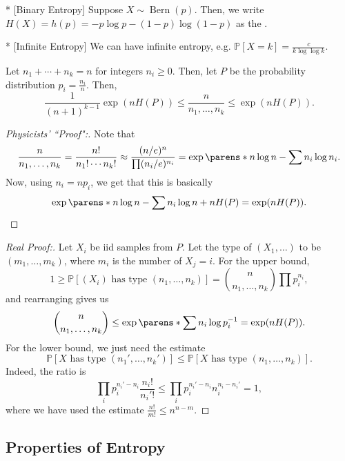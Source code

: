 \begin{exm}*
	[Binary Entropy]
	Suppose $X \sim \operatorname{Bern}(p)$. Then, we write $H(X) = h(p) = -p\log p - (1-p)\log (1-p)$ as the .
\end{exm}

\begin{exm}*
	[Infinite Entropy]
	We can have infinite entropy, e.g. $\mathbb P[X=k] = \frac{c}{k\log \log k}$.
\end{exm}

\begin{fact}
	Let $n_1 + \cdots + n_k = n$ for integers $n_i \geq 0$. Then, let $P$ be the probability distribution $p_i = \frac{n_i}{n}$. Then, \[
		\frac{1}{(n+1)^{k-1}} \exp (nH(P)) \leq \frac{n}{n_1, \ldots, n_k} \leq \exp (nH(P)).
	\]
\end{fact}

\begin{proof}
	[Physicists' ``Proof":]
	Note that \[
		\frac{n}{n_1,\ldots, n_k} = \frac{n!}{n_1!\cdots n_k!} \approx \frac{(n/e)^n}{\prod (n_i/e)^{n_i}} = \exp \parens*{n\log n - \sum n_i \log n_i}.
	\]
	Now, using $n_i = np_i$, we get that this is basically \[
		\exp \parens*{n\log n - \sum n_i\log n + nH(P)} = \exp(nH(P)).
	\]
\end{proof}

\begin{proof}
	[Real Proof:]
	Let $X_i$ be iid samples from $P$. Let the type of $(X_1,\ldots)$ to be $(m_1,\ldots, m_k)$, where $m_i$ is the number of $X_j = i$. For the upper bound, \[
		1\geq \mathbb P[(X_i) \text{ has type }(n_1,\ldots, n_k)] = \binom{n}{n_1,\ldots, n_k} \prod p_i^{n_i},
	\]and rearranging gives us \[
		\binom{n}{n_1,\ldots, n_k} \leq \exp\parens*{\sum n_i\log p_i^{-1}} = \exp (nH(P)).
	\]
	For the lower bound, we just need the estimate\[
		\mathbb P[X \text{ has type }(n_1', \ldots, n_k')] \leq \mathbb P[X \text{ has type }(n_1,\ldots, n_k)].
	\]
	Indeed, the ratio is \[
		\prod_i p_i^{n_i' - n_i} \frac{n_i!}{n_i'!} \leq \prod_i p_i^{n_i' - n_i} n_i^{n_i - n_i'} = 1,
	\]
	where we have used the estimate $\frac{n!}{m!} \leq n^{n-m}$.
\end{proof}

\subsection{Properties of Entropy}

